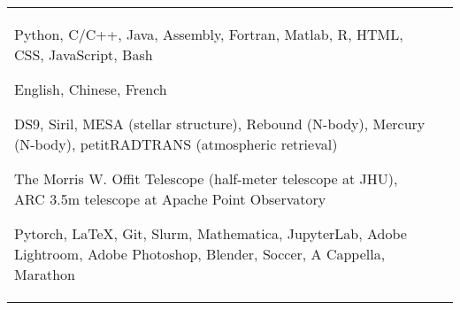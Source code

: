 \documentclass[10pt]{article} %
\begin{document}
\begin{longtable}{L{4cm}@{\hskip 0.15in}L{13.5cm}} %

	
	
	
	{Python, C/C++, Java, Assembly, Fortran, Matlab, R, HTML, CSS, JavaScript, Bash} %
	
	{English, Chinese, French} %
	
	{DS9, Siril, MESA (stellar structure), Rebound (N-body), Mercury (N-body), petitRADTRANS (atmospheric retrieval)} %
	

	{The Morris W. Offit Telescope (half-meter telescope at JHU), ARC 3.5m telescope at Apache Point Observatory} %

	
	
	{Pytorch, \LaTeX, Git, Slurm, Mathematica, JupyterLab, Adobe Lightroom, Adobe Photoshop, Blender, Soccer, A Cappella, Marathon} 
\end{longtable}
\end{document}
